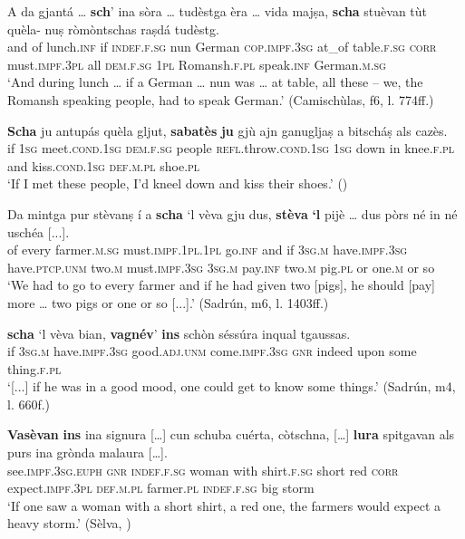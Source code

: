 \ea
\label{ex:cond2}
\gll    A da gjantá … \textbf{sch}’ ina sòra … tudèstga èra … vida majṣa, \textbf{scha} stuèvan tùt quèla- nuṣ ròmòntschas raṣdá tudèstg.\\
and of lunch.\textsc{inf} {} if \textsc{indef.f.sg} nun {} German \textsc{cop.impf.3sg} {} at\_of table.\textsc{f.sg} \textsc{corr} must.\textsc{impf.3pl} all \textsc{dem.f.sg} \textsc{1pl} Romansh.\textsc{f.pl} speak.\textsc{inf} German.\textsc{m.sg}\\
\glt `And during lunch … if a German … nun was … at table, all these – we, the Romansh speaking people, had to speak German.' (Camischùlas, f6, l. 774ff.)
\z

\ea
\label{ex:cond3}
\gll \textbf{Scha} ju antupás quèla gljut, \textbf{sabatès} \textbf{ju} gjù ajn ganugljaṣ a bitscháṣ als cazès.\\
if \textsc{1sg} meet.\textsc{cond.1sg} \textsc{dem.f.sg} people \textsc{refl}.throw.\textsc{cond.1sg} \textsc{1sg} down in knee.\textsc{f.pl} and kiss.\textsc{cond.1sg} \textsc{def.m.pl} shoe.\textsc{pl}\\
\glt `If I met these people, I’d kneel down and kiss their shoes.' (\citealt[60]{Berther1998})
\z

\ea
\label{ex:cond4}
\gll Da mintga pur stèvanṣ í a \textbf{scha} `l vèva gju dus, \textbf{stèva} \textbf{`l} pijè …  dus pòrs né in né uschéa [...].\\
of every farmer.\textsc{m.sg} must.\textsc{impf.1pl.1pl} go.\textsc{inf} and if \textsc{3sg.m} have.\textsc{impf.3sg} have.\textsc{ptcp.unm} two.\textsc{m} must.\textsc{impf.3sg}  \textsc{3sg.m} pay.\textsc{inf} {} two.\textsc{m} pig.\textsc{pl} or one.\textsc{m} or so\\
\glt `We had to go to every farmer and if he had given two [pigs], he should [pay] more … two pigs or one or so [...].' (Sadrún, m6, l. 1403ff.)
\z

\ea
\label{ex:cond5}
\gll  [...] \textbf{scha} `l vèva bian, \textbf{vagnév}’ \textbf{ins} schòn séssúra inqual tgaussas.\\
{} if \textsc{3sg.m}  have.\textsc{impf.3sg} good.\textsc{adj.unm} come.\textsc{impf.3sg} \textsc{gnr} indeed upon some thing.\textsc{f.pl} \\
\glt `[...] if he was in a good mood, one could get to know some things.' (Sadrún, m4, l. 660f.)
\z

\ea
\label{ex:cond6}
\gll    \textbf{Vasèvan} \textbf{ins} ina signura […] cun schuba cuérta, còtschna, […] \textbf{lura} spitgavan als purs ina grònda malaura […].\\
     see.\textsc{impf.3sg.euph} \textsc{gnr} \textsc{indef.f.sg} woman {} with shirt.\textsc{f.sg} short red {} \textsc{corr} expect.\textsc{impf.3pl} \textsc{def.m.pl} farmer.\textsc{pl} \textsc{indef.f.sg} big storm\\
\glt `If one saw a woman with a short shirt, a red one, the farmers would expect a heavy storm.' (Sèlva, \citealt[34]{Büchli1966})
\z

